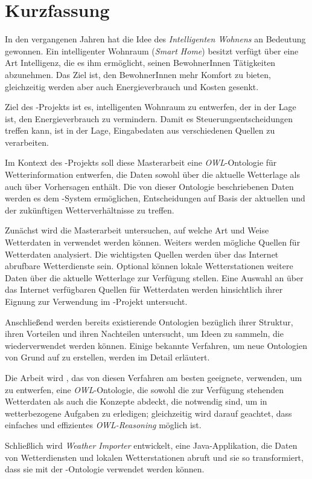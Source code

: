 \chapter*{Kurzfassung}

In den vergangenen Jahren hat die Idee des \emph{Intelligenten Wohnens} an Bedeutung gewonnen. Ein intelligenter Wohnraum (\emph{Smart Home}) besitzt verfügt über eine Art Intelligenz, die es ihm ermöglicht, seinen BewohnerInnen Tätigkeiten abzunehmen. Das Ziel ist, den BewohnerInnen mehr Komfort zu bieten, gleichzeitig werden aber auch Energieverbrauch und Kosten gesenkt.

Ziel des \thinkhome-Projekts ist es, intelligenten Wohnraum zu entwerfen, der in der Lage ist, den Energieverbrauch zu vermindern. Damit es Steuerungsentscheidungen treffen kann, ist \thinkhome in der Lage, Eingabedaten aus verschiedenen Quellen zu verarbeiten.

Im Kontext des \thinkhome-Projekts soll diese Masterarbeit eine \emph{OWL}-Ontologie für Wetterinformation entwerfen, die Daten sowohl über die aktuelle Wetterlage als auch über Vorhersagen enthält. Die von dieser Ontologie beschriebenen Daten werden es dem \thinkhome-System ermöglichen, Entscheidungen auf Basis der aktuellen und der zukünftigen Wetterverhältnisse zu treffen.

Zunächst wird die Masterarbeit untersuchen, auf welche Art und Weise Wetterdaten in \thinkhome verwendet werden können. Weiters werden mögliche Quellen für Wetterdaten analysiert. Die wichtigsten Quellen werden über das Internet abrufbare Wetterdienste sein. Optional können lokale Wetterstationen weitere Daten über die aktuelle Wetterlage zur Verfügung stellen. Eine Auswahl an über das Internet verfügbaren Quellen für Wetterdaten werden hinsichtlich ihrer Eignung zur Verwendung im \thinkhome-Projekt untersucht.

Anschließend werden bereits existierende Ontologien bezüglich ihrer Struktur, ihren Vorteilen und ihren Nachteilen untersucht, um Ideen zu sammeln, die wiederverwendet werden können. Einige bekannte Verfahren, um neue Ontologien von Grund auf zu erstellen, werden im Detail erläutert.

Die Arbeit wird \methontology, das von diesen Verfahren am besten geeignete, verwenden, um \thinkhomeweather zu entwerfen, eine \textit{OWL}-Ontologie, die sowohl die zur Verfügung stehenden Wetterdaten als auch die Konzepte abdeckt, die notwendig sind, um in \thinkhome wetterbezogene Aufgaben zu erledigen; gleichzeitig wird darauf geachtet, dass einfaches und effizientes \emph{OWL-Reasoning} möglich ist.

Schließlich wird \emph{Weather Importer} entwickelt, eine Java-Applikation, die Daten von Wetterdiensten und lokalen Wetterstationen abruft und sie so transformiert, dass sie mit der \thinkhomeweather-Ontologie verwendet werden können.